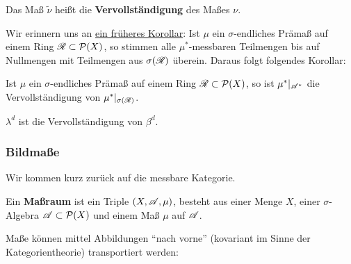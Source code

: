 \begin{definition}
\begin{mdframed}
Das Maß $\widetilde{\nu}$ heißt die \textbf{Vervollständigung} des Maßes $\nu$. 
\end{mdframed}
\end{definition}

Wir erinnern uns an \hyperref[uebereinstimmung-alg]{ein früheres Korollar}: Ist $\mu$ ein $\sigma$-endliches Prämaß auf einem Ring $\RR \subset \PP(X)$, so stimmen alle $\mu^*$-messbaren Teilmengen bis auf Nullmengen mit Teilmengen aus $\sigma(\RR)$ überein. Daraus folgt folgendes Korollar:

\begin{korollar}
\begin{mdframed}
Ist $\mu$ ein $\sigma$-endliches Prämaß auf einem Ring $\RR \subset \PP(X)$, so ist $\mu^*|_{\AA^*}$ die Vervollständigung von $\mu^*|_{\sigma(\RR)}$.
\end{mdframed}
\end{korollar}

\begin{hauptbsp}
\begin{mdframed}
$\lambda^d$ ist die Vervollständigung von $\beta^d$.
\end{mdframed}
\end{hauptbsp}

\subsubsection{Bildmaße}
Wir kommen kurz zurück auf die messbare Kategorie.
\begin{definition}
\begin{mdframed}
Ein \textbf{Maßraum} ist ein Triple $(X,\AA,\mu)$, besteht aus einer Menge $X$, einer $\sigma$-Algebra $\AA\subset \PP(X)$ und einem Maß $\mu$ auf $\AA$.
\end{mdframed}
\end{definition}

Maße können mittel Abbildungen ``nach vorne'' (kovariant im Sinne der Kategorientheorie) transportiert werden:

